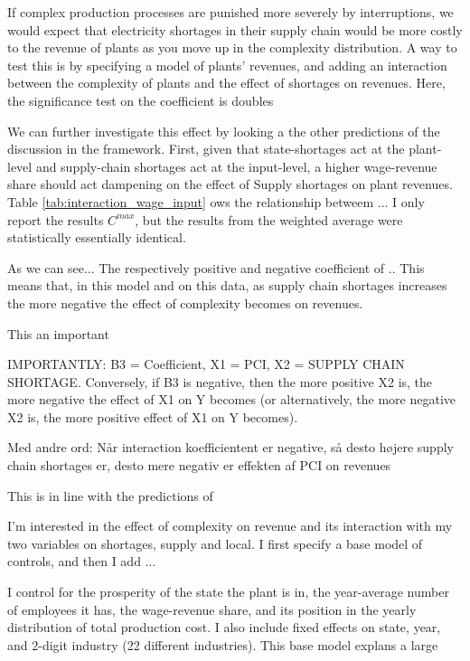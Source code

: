 \documentclass[11pt]{article}
\begin{document}
If complex production processes are punished more severely by interruptions, we would expect that electricity shortages in their supply chain would be more costly to the revenue of plants as you move up in the complexity distribution. A way to test this is by specifying a model of plants' revenues, and adding an interaction between the complexity of plants and the effect of shortages on revenues. Here, the significance test on the coefficient is doubles 


We can further investigate this effect by looking a the other predictions of the discussion in the framework. First, given that state-shortages act at the plant-level and supply-chain shortages act at the input-level, a higher wage-revenue share should act dampening on the effect of Supply shortages on plant revenues. Table \ref{tab:interaction_wage_input} ows the relationship betweem ...
I only report the results $C^{max}$, but the results from the weighted average were statistically essentially identical.

As we can see... The respectively positive and negative coefficient of  .. 
This means that, in this model and on this data, as supply chain shortages increases the more negative the effect of complexity becomes on revenues.


This an important

IMPORTANTLY: B3 = Coefficient, X1 = PCI, X2 = SUPPLY CHAIN SHORTAGE.
Conversely, if B3 is negative, then the more positive X2 is, the more negative the effect of X1 on Y becomes (or alternatively, the more negative X2 is, the more positive effect of X1 on Y becomes). 

Med andre ord: Når interaction koefficientent er negative, så desto højere supply chain shortages er, desto mere negativ er effekten af PCI on revenues


This is in line with the predictions of 





I'm interested in the effect of complexity on revenue and its interaction with my two variables on shortages, supply and local. 
I first specify a base model of controls, and then I add ...

I control for the prosperity of the state the plant is in, the year-average number of employees it has, the wage-revenue share, and its position in the yearly distribution of total production cost. I also include fixed effects on state, year, and 2-digit industry (22 different industries). This base model explans a large 
\end{document}
